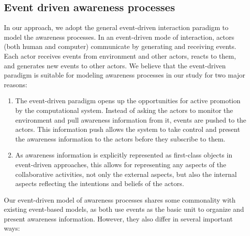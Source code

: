 \subsection{Event driven awareness processes} %
\label{sub:event_driven_awareness_processes}
In our approach, we adopt the general event-driven interaction paradigm \cite{Etzion2010} to model the awareness processes. In an event-driven mode of interaction, actors (both human and computer) communicate by generating and receiving events. Each actor receives events from environment and other actors, reacts to them, and generates new events to other actors. We believe that the event-driven paradigm is suitable for modeling awareness processes in our study for two major reasons:

\begin{enumerate}
   \item The event-driven paradigm opens up the opportunities for active promotion by the computational system. Instead of asking the actors to monitor the environment and pull awareness information from it, events are pushed to the actors. This information push allows the system to take control and present the awareness information to the actors before they subscribe to them.
   \item As awareness information is explicitly represented as first-class objects in event-driven approaches, this allows for representing any aspects of the collaborative activities, not only the external aspects, but also the internal aspects reflecting the intentions and beliefs of the actors.
\end{enumerate}

Our event-driven model of awareness processes shares some commonality with existing event-based models, as both use events as the basic unit to organize and present awareness information. However, they also differ in several important ways:

